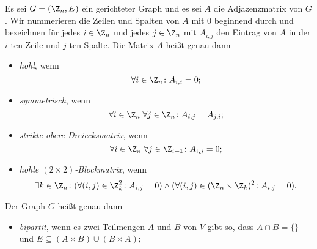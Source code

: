 \documentclass[12pt]{article}
\begin{document}

\begin{aufgabe}[4]
  Es sei $G = (\Z_n, E)$ ein gerichteter Graph und es sei $A$ die Adjazenzmatrix von $G$. Wir nummerieren die Zeilen und Spalten von $A$ mit $0$ beginnend durch und bezeichnen für jedes $i \in \Z_n$ und jedes $j \in \Z_n$ mit $A_{i,j}$ den Eintrag von $A$ in der $i$-ten Zeile und $j$-ten Spalte. Die Matrix $A$ heißt genau dann
  \begin{itemize}
    \item \emph{hohl}, wenn %
          \begin{equation*}
            \forall i \in \Z_n \colon A_{i,i} = 0;
          \end{equation*}
    \item \emph{symmetrisch}, wenn
          \begin{equation*}
            \forall i \in \Z_n\; \forall j \in \Z_n \colon A_{i,j} = A_{j,i};
          \end{equation*}
    \item \emph{strikte obere Dreiecksmatrix}, wenn
          \begin{equation*}
            \forall i \in \Z_n\; \forall j \in \Z_{i + 1} \colon A_{i,j} = 0;
          \end{equation*}
    \item \emph{hohle $(2 \times 2)$-Blockmatrix}, wenn
          \begin{equation*}
            \exists k \in \Z_n \colon
              (\forall (i,j) \in \Z_k^2 \colon A_{i,j} = 0) \land
              (\forall (i,j) \in (\Z_n \smallsetminus \Z_k)^2 \colon A_{i,j} = 0).
          \end{equation*}
  \end{itemize}
  Der Graph $G$ heißt genau dann
  \begin{itemize}
    \item \emph{bipartit}, wenn es zwei Teilmengen $A$ und $B$ von $V$ gibt so, dass $A \cap B = \{\}$ und $E \subseteq (A \times B) \cup (B \times A)$;

\end{itemize}
\end{aufgabe}
\end{document}
